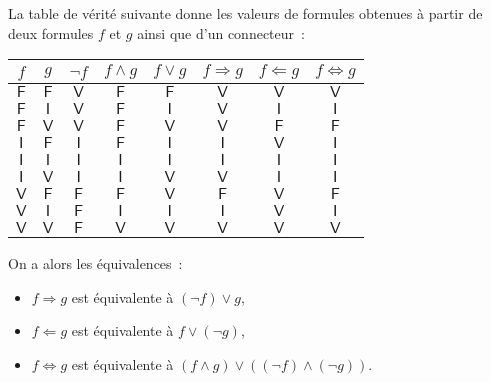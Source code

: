 La table de vérité suivante donne les valeurs de formules obtenues à partir de deux formules $f$ et $g$ ainsi que d'un connecteur :
\begin{center}
\begin{tabular}{c c | c c c c c c}
    $f$          & $g$          & $\neg f$     & $f \wedge g$ & $f \vee g$ & $f \Rightarrow g$ & $f \Leftarrow g$ & $f \Leftrightarrow g$ 
    \\ \hline 
    $\mathsf{F}$ & $\mathsf{F}$ & $\mathsf{V}$ & $\mathsf{F}$ & $\mathsf{F}$ & $\mathsf{V}$    & $\mathsf{V}$     & $\mathsf{V}$
    \\
    $\mathsf{F}$ & $\mathsf{I}$ & $\mathsf{V}$ & $\mathsf{F}$ & $\mathsf{I}$ & $\mathsf{V}$    & $\mathsf{I}$     & $\mathsf{I}$
    \\
    $\mathsf{F}$ & $\mathsf{V}$ & $\mathsf{V}$ & $\mathsf{F}$ & $\mathsf{V}$ & $\mathsf{V}$    & $\mathsf{F}$     & $\mathsf{F}$
    \\ 
    $\mathsf{I}$ & $\mathsf{F}$ & $\mathsf{I}$ & $\mathsf{F}$ & $\mathsf{I}$ & $\mathsf{I}$    & $\mathsf{V}$     & $\mathsf{I}$ 
    \\ 
    $\mathsf{I}$ & $\mathsf{I}$ & $\mathsf{I}$ & $\mathsf{I}$ & $\mathsf{I}$ & $\mathsf{I}$    & $\mathsf{I}$     & $\mathsf{I}$
    \\
    $\mathsf{I}$ & $\mathsf{V}$ & $\mathsf{I}$ & $\mathsf{I}$ & $\mathsf{V}$ & $\mathsf{V}$    & $\mathsf{I}$     & $\mathsf{I}$ 
    \\
    $\mathsf{V}$ & $\mathsf{F}$ & $\mathsf{F}$ & $\mathsf{F}$ & $\mathsf{V}$ & $\mathsf{F}$    & $\mathsf{V}$     & $\mathsf{F}$ 
    \\ 
    $\mathsf{V}$ & $\mathsf{I}$ & $\mathsf{F}$ & $\mathsf{I}$ & $\mathsf{I}$ & $\mathsf{I}$    & $\mathsf{V}$     & $\mathsf{I}$
    \\
    $\mathsf{V}$ & $\mathsf{V}$ & $\mathsf{F}$ & $\mathsf{V}$ & $\mathsf{V}$ & $\mathsf{V}$    & $\mathsf{V}$     & $\mathsf{V}$ 
\end{tabular}
\end{center}
On a alors les équivalences : 
\begin{itemize}[nosep]
    \item $f \Rightarrow g$ est équivalente à $(\neg f) \vee g$,
    \item $f \Leftarrow g$ est équivalente à $f \vee (\neg g)$,
    \item $f \Leftrightarrow g$ est équivalente à $(f \wedge g) \vee ((\neg f) \wedge (\neg g))$.
\end{itemize}

